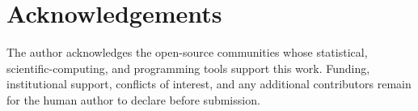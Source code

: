 \section{Acknowledgements}

The author acknowledges the open-source communities whose statistical,
scientific-computing, and programming tools support this work. Funding,
institutional support, conflicts of interest, and any additional contributors
remain for the human author to declare before submission.
